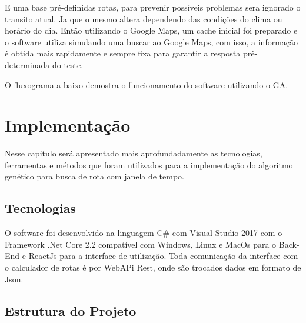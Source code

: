 E uma base pré-definidas rotas, para prevenir possíveis problemas sera ignorado o transito atual. Ja que o mesmo altera dependendo das condições do clima ou horário do dia. Então utilizando o Google Maps, um cache inicial foi preparado e o software utiliza simulando uma buscar ao Google Maps, com isso, a informação é obtida mais rapidamente e sempre fixa para garantir a resposta pré-determinada do teste.

O fluxograma a baixo demostra o funcionamento do software utilizando o GA.

\begin{minipage}{\linewidth}
	\label{fig:FluxoGA}
\end{minipage}

\chapter{Implementação}
 
Nesse capitulo será apresentado mais aprofundadamente as tecnologias, ferramentas e métodos que foram utilizados para a implementação do algoritmo genético para busca de rota com janela de tempo.

\section{Tecnologias}

O software foi desenvolvido na linguagem C\# com Visual Studio 2017 com o Framework  .Net Core 2.2 compatível com Windows, Linux e MacOs para o Back-End e ReactJs para a interface de utilização.
Toda comunicação da interface com o calculador de rotas é por WebAPi Rest, onde são trocados dados em formato de Json.

\section{Estrutura do Projeto}

